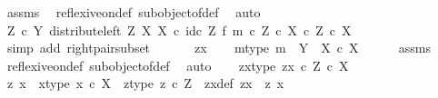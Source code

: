 \begin{isabellebody}
\ assms\ \isamarkupfalse%
\ reflexive{\isacharunderscore}{\kern0pt}on{\isacharunderscore}{\kern0pt}def\ subobject{\isacharunderscore}{\kern0pt}of{\isacharunderscore}{\kern0pt}def{}\ \isamarkupfalse%
\ auto\isanewline
\ \ \isamarkupfalse%
\ \isamarkupfalse%
\ {\isachardoublequoteopen}{\isacharparenleft}{\kern0pt}Z\ {\isasymtimes}\isactrlsub c\ Y{\isacharcomma}{\kern0pt}\ distribute{\isacharunderscore}{\kern0pt}left\ Z\ X\ X\ {\isasymcirc}\isactrlsub c\ {\isacharparenleft}{\kern0pt}id\isactrlsub c\ Z\ {\isasymtimes}\isactrlsub f\ m{\isacharparenright}{\kern0pt}{\isacharparenright}{\kern0pt}\ {\isasymsubseteq}\isactrlsub c\ {\isacharparenleft}{\kern0pt}Z\ {\isasymtimes}\isactrlsub c\ X{\isacharparenright}{\kern0pt}\ {\isasymtimes}\isactrlsub c\ Z\ {\isasymtimes}\isactrlsub c\ X{\isachardoublequoteclose}\isanewline
\ \ \ \ \isamarkupfalse%
\ {\isacharparenleft}{\kern0pt}simp\ add{\isacharcolon}{\kern0pt}\ right{\isacharunderscore}{\kern0pt}pair{\isacharunderscore}{\kern0pt}subset{\isacharparenright}{\kern0pt}\isanewline
\ \ \isamarkupfalse%
\isanewline
\ \ \isamarkupfalse%
\ zx\isanewline
\ \ \isamarkupfalse%
\ m{\isacharunderscore}{\kern0pt}type{\isacharcolon}{\kern0pt}\ {\isachardoublequoteopen}m\ {\isacharcolon}{\kern0pt}\ Y\ {\isasymrightarrow}\ X\ {\isasymtimes}\isactrlsub c\ X{\isachardoublequoteclose}\isanewline
\ \ \ \ \isamarkupfalse%
\ assms\ \isamarkupfalse%
\ reflexive{\isacharunderscore}{\kern0pt}on{\isacharunderscore}{\kern0pt}def\ subobject{\isacharunderscore}{\kern0pt}of{\isacharunderscore}{\kern0pt}def{}\ \isamarkupfalse%
\ auto\isanewline
\ \ \isamarkupfalse%
\ zx{\isacharunderscore}{\kern0pt}type{\isacharcolon}{\kern0pt}\ {\isachardoublequoteopen}zx\ {\isasymin}\isactrlsub c\ Z\ {\isasymtimes}\isactrlsub c\ X{\isachardoublequoteclose}\isanewline
\ \ \isamarkupfalse%
\ \isamarkupfalse%
\ z\ x\ \ x{\isacharunderscore}{\kern0pt}type{\isacharcolon}{\kern0pt}\ {\isachardoublequoteopen}x\ {\isasymin}\isactrlsub c\ X{\isachardoublequoteclose}\ \ z{\isacharunderscore}{\kern0pt}type{\isacharcolon}{\kern0pt}\ {\isachardoublequoteopen}z\ {\isasymin}\isactrlsub c\ Z{\isachardoublequoteclose}\ \ zx{\isacharunderscore}{\kern0pt}def{\isacharcolon}{\kern0pt}\ {\isachardoublequoteopen}zx\ {\isacharequal}{\kern0pt}\ {\isasymlangle}z{\isacharcomma}{\kern0pt}\ x{\isasymrangle}{\isachardoublequoteclose}\isanewline

\end{isabellebody}
